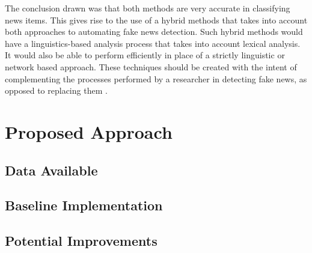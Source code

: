 \documentclass[11pt,a4paper]{article}
\begin{document}
The conclusion drawn was that both methods are very accurate in classifying news items. This gives rise to the use of a hybrid methods that takes into account both approaches to automating fake news detection. Such hybrid methods would have a linguistics-based analysis process that takes into account lexical analysis. It would also be able to perform efficiently in place of a strictly linguistic or network based approach. These techniques should be created with the intent of complementing the processes performed by a researcher in detecting fake news, as opposed to replacing them \cite{conroy2015automatic}. \\


\section{Proposed Approach}

\subsection{Data Available}

\subsection{Baseline Implementation}

\subsection{Potential Improvements} 







%
%


\end{document}
